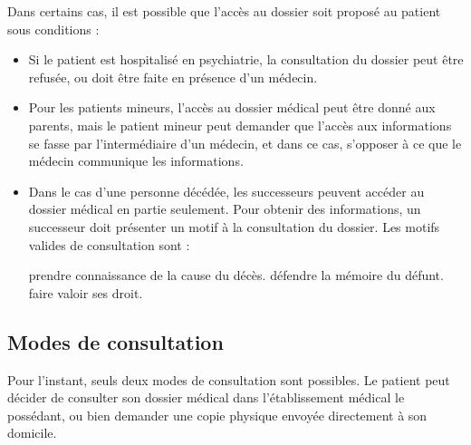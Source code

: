 Dans certains cas, il est possible que l'accès au dossier soit proposé au patient sous conditions :


\begin{itemize}

    \item Si le patient est hospitalisé en psychiatrie, la consultation du dossier peut être
refusée, ou doit être faite en présence d'un médecin.

\item Pour les patients mineurs, l'accès au dossier médical peut être donné aux parents,
mais le patient mineur peut demander que l'accès aux informations se fasse par
l'intermédiaire d'un médecin, et dans ce cas, s'opposer à ce que le médecin communique les informations.

\item Dans le cas d'une personne décédée, les successeurs peuvent accéder au dossier médical
en partie seulement. Pour obtenir des informations, un successeur doit présenter un motif
à la consultation du dossier. Les motifs valides de consultation sont :

    \subitem prendre connaissance de la cause du décès.
    \subitem défendre la mémoire du défunt.
    \subitem faire valoir ses droit.

\end{itemize}

\subsection{Modes de consultation}

Pour l'instant, seuls deux modes de consultation sont possibles. Le patient peut décider de
consulter son dossier médical dans l'établissement médical le possédant, ou bien demander 
une copie physique envoyée directement à son domicile.


